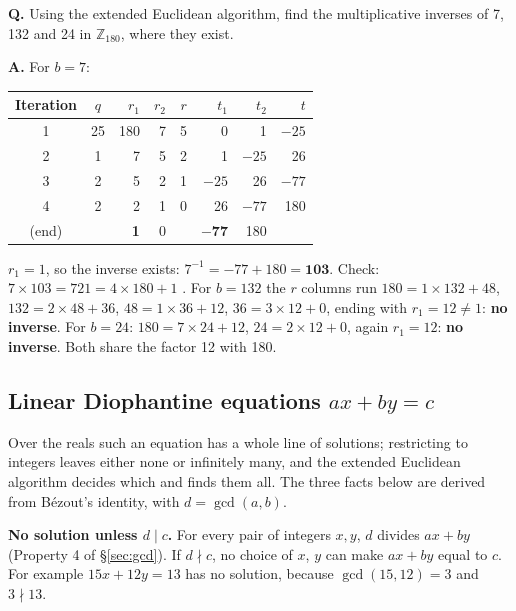 \begin{worked}
\textbf{Q.} Using the extended Euclidean algorithm, find the multiplicative inverses of 7, 132 and 24 in $\mathbb{Z}_{180}$, where they exist.

\textbf{A.} For $b = 7$:
\begin{center}\small
\begin{tabular}{@{}c|c|rrr|rrr@{}}
\toprule
Iteration & $q$ & $r_1$ & $r_2$ & $r$ & $t_1$ & $t_2$ & $t$\\
\midrule
1 & 25 & 180 & 7 & 5 & 0 & 1 & $-25$\\
2 & 1 & 7 & 5 & 2 & 1 & $-25$ & 26\\
3 & 2 & 5 & 2 & 1 & $-25$ & 26 & $-77$\\
4 & 2 & 2 & 1 & 0 & 26 & $-77$ & 180\\
(end) & & \textbf{1} & 0 & & $\mathbf{-77}$ & 180 & \\
\bottomrule
\end{tabular}
\end{center}
$r_1 = 1$, so the inverse exists: $7^{-1} = -77 + 180 = \mathbf{103}$. Check: $7 \times 103 = 721 = 4 \times 180 + 1$ \checkmark.
For $b = 132$ the $r$ columns run $180 = 1 \times 132 + 48$, $132 = 2 \times 48 + 36$, $48 = 1 \times 36 + 12$, $36 = 3 \times 12 + 0$, ending with $r_1 = 12 \ne 1$: \textbf{no inverse}. For $b = 24$: $180 = 7 \times 24 + 12$, $24 = 2 \times 12 + 0$, again $r_1 = 12$: \textbf{no inverse}. Both share the factor 12 with 180.
\end{worked}

\subsection{Linear Diophantine equations \texorpdfstring{$ax + by = c$}{ax + by = c} \hot}
 Over the reals such an equation has a whole line of solutions; restricting to integers leaves either none or infinitely many, and the extended Euclidean algorithm decides which and finds them all. The three facts below are derived from Bézout's identity, with $d = \gcd(a, b)$.

\textbf{No solution unless $d \mid c$.} For every pair of integers $x, y$, $d$ divides $ax + by$ (Property 4 of \S\ref{sec:gcd}). If $d \nmid c$, no choice of $x$, $y$ can make $ax + by$ equal to $c$. For example $15x + 12y = 13$ has no solution, because $\gcd(15, 12) = 3$ and $3 \nmid 13$.

